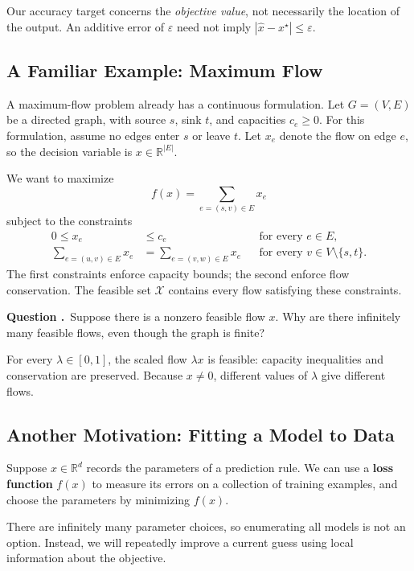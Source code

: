 \documentclass[11pt,letterpaper]{article}
\newif\ifstudentversion
\newcommand{\vs}[1]{\vspace{#1}}
\newcommand{\hide}[1]{%
  \ifstudentversion
    \ifmmode\phantom{#1}\else\underline{\phantom{#1}}\fi
  \else #1\fi}
\theoremstyle{definition}
\theoremstyle{plain}
\newcounter{question}
\newenvironment{Qu}{%
  \par\medskip\refstepcounter{question}
  \noindent\textbf{Question \thequestion.}\ }{\par\medskip}
\newcommand{\QU}{\begin{Qu}}
\newcommand{\R}{\mathbb R}
\newcommand{\X}{\mathcal X}
\newcommand{\eps}{\varepsilon}
\newcommand{\xstar}{x^\star}
\begin{document}
Our accuracy target concerns the \emph{objective value}, not necessarily the
location of the output. An additive error of $\eps$ need not imply
$|\widehat x-\xstar|\leq\eps$.

\newpage
\subsection{A Familiar Example: Maximum Flow}

A maximum-flow problem already has a continuous formulation. Let
$G=(V,E)$ be a directed graph, with source $s$, sink $t$, and capacities
$c_e\geq0$. For this formulation, assume no edges enter $s$ or leave $t$.
Let $x_e$ denote the flow on edge $e$, so the decision variable is
$x\in\R^{|E|}$.

We want to maximize
\[
  f(x)=\sum_{e=(s,v)\in E}x_e
\]
subject to the constraints
\begin{align*}
  0\leq x_e&\leq c_e &&\text{for every }e\in E,\\
  \sum_{e=(u,v)\in E}x_e&=
  \sum_{e=(v,w)\in E}x_e &&\text{for every }v\in V\setminus\{s,t\}.
\end{align*}
The first constraints enforce \hide{capacity bounds}; the second enforce
\hide{flow conservation}. The feasible set $\X$ contains every flow satisfying
these constraints.

\QU Suppose there is a nonzero feasible flow $x$. Why are there infinitely
many feasible flows, even though the graph is finite?
\end{Qu}
\begin{answer}
For every $\lambda\in[0,1]$, the scaled flow $\lambda x$ is feasible:
capacity inequalities and conservation are preserved. Because $x\neq0$,
different values of $\lambda$ give different flows.
\end{answer}
\vs{0.25in}

\subsection{Another Motivation: Fitting a Model to Data}

Suppose $x\in\R^d$ records the parameters of a prediction rule. We can use a
\textbf{loss function} $f(x)$ to measure its errors on a collection of
training examples, and choose the parameters by minimizing $f(x)$.

There are infinitely many parameter choices, so enumerating all models is
not an option. Instead, we will repeatedly improve a current guess using
local information about the objective.
\end{document}

